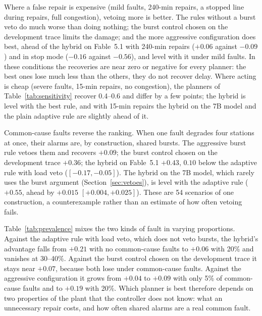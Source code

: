 \documentclass[preprint,11pt]{elsarticle}
\begin{document}
Where a false repair is expensive (mild faults, 240-min repairs, a stopped line during repairs, full congestion), vetoing more is better. The rules without a burst veto do much worse than doing nothing; the burst control chosen on the development trace limits the damage; and the more aggressive configuration does best, ahead of the hybrid on Fable~5.1 with 240-min repairs ($+0.06$ against $-0.09$) and in stop mode ($-0.16$ against $-0.56$), and level with it under mild faults. In these conditions the recoveries are near zero or negative for every planner: the best ones lose much less than the others, they do not recover delay. Where acting is cheap (severe faults, 15-min repairs, no congestion), the planners of Table~\ref{tab:sensitivity} recover 0.4--0.6 and differ by a few points; the hybrid is level with the best rule, and with 15-min repairs the hybrid on the 7B model and the plain adaptive rule are slightly ahead of it.

Common-cause faults reverse the ranking. When one fault degrades four stations at once, their alarms are, by construction, shared bursts. The aggressive burst rule vetoes them and recovers $+0.09$; the burst control chosen on the development trace $+0.36$; the hybrid on Fable~5.1 $+0.43$, $0.10$ below the adaptive rule with load veto ($[-0.17, -0.05]$). The hybrid on the 7B model, which rarely uses the burst argument (Section~\ref{sec:vetoes}), is level with the adaptive rule ($+0.55$, ahead by $+0.015$ $[+0.004, +0.025]$). These are 54 scenarios of one construction, a counterexample rather than an estimate of how often vetoing fails.

Table~\ref{tab:prevalence} mixes the two kinds of fault in varying proportions. Against the adaptive rule with load veto, which does not veto bursts, the hybrid's advantage falls from $+0.21$ with no common-cause faults to $+0.06$ with 20\% and vanishes at 30--40\%. Against the burst control chosen on the development trace it stays near $+0.07$, because both lose under common-cause faults. Against the aggressive configuration it grows from $+0.04$ to $+0.09$ with only 5\% of common-cause faults and to $+0.19$ with 20\%. Which planner is best therefore depends on two properties of the plant that the controller does not know: what an unnecessary repair costs, and how often shared alarms are a real common fault.
\end{document}
